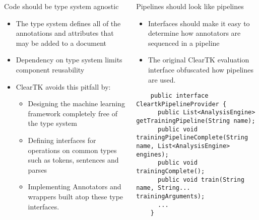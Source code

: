 \documentclass[final]{beamer}
\begin{document}
\begin{frame}[fragile]
\begin{columns}[t]
\begin{column}{.45\linewidth}
    \begin{block}{Code should be type system agnostic}
    \begin{itemize}
            \item The type system defines all of the annotations and attributes that may be added to a document
            \item Dependency on type system limits component reusability
            \item ClearTK avoids this pitfall by:
                    \begin{itemize}
                            \item Designing the machine learning framework completely free of the type system
                            \item Defining interfaces for operations on common types such as tokens, sentences and parses
                            \item Implementing Annotators and wrappers built atop these type interfaces.
                    \end{itemize}
    \end{itemize}
                    
    \end{block}


  \end{column}


  \begin{column}{.45\linewidth}
    


    \begin{block}{Pipelines should look like pipelines}
        \begin{itemize}
            \item Interfaces should make it easy to determine how annotators are sequenced in a pipeline
        \end{itemize}

        \begin{itemize}
            \item The original ClearTK evaluation interface obfuscated how pipelines are used.
        \end{itemize}

        \begin{lstlisting}
    public interface CleartkPipelineProvider {
      public List<AnalysisEngine> getTrainingPipeline(String name);
      public void trainingPipelineComplete(String name, List<AnalysisEngine> engines);
      public void trainingComplete();
      public void train(String name, String... trainingArguments);
      ...
    }
      \end{lstlisting}


\end{block}
\end{column}
\end{columns}
\end{frame}
\end{document}
